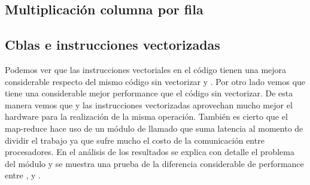 \subsection{Multiplicación columna por fila}

    \def\model{ColumnByRow}
    \def\analisisAmdahl{
    Se puede observar que el speed up teórico tiende al máximo speed-up,
    mientras que el real nos muestra que no usa toda la paralelizacion, ya que al
    pasar de 1 a 2 threads el tiempo no cae a la mitad, y al pasar de 1 a 4 threads
    no cae a la cuarta parte. Se puede ver que tiene un speed-up de casi 2 lo
    cual quiere decir que hace uso de la mitad de la paralelización.
    }
    \def\analisisGustafson{
    Se puede ver que estos resultados demuestran que la sección serie del
    problema se mantiene casi constante respecto de la sección paralela,
    que varía en forma ascendente con el tamaño de los datos de entrada.
    Pero además se puede observar que hay mucha ineficiencia respecto del uso de
    la paralelización, ya que al aumentar el trabajo en casi el doble y usar
    dos procesadores debería tardar aproximadamente lo mismo. Sin embargo, vemos
    que el tiempo paralelo se duplicó, lo cual muestra que hay un problema de
    comunicación al aumentar el paralelismo. Más adelante se explicará que el
    módulo Pool es ineficiente respecto del uso de recursos.
    }
    
    \newpage
    \clearpage

\subsection{Cblas e instrucciones vectorizadas}
    \def\text{Tiempo serie de multiplicación en segundos}
    \def\path{dgemm.png}
    \def\scale{.6}
    

    Podemos ver que las instrucciones vectoriales en el código
     tienen una mejora considerable respecto del mismo
    código sin vectorizar y . Por otro lado vemos que 
    tiene una considerable mejor performance que el código
     sin vectorizar.
    De esta manera vemos que  y las instrucciones vectorizadas
    aprovechan mucho mejor el hardware para la realización de la misma operación.
    También es cierto que el map-reduce hace uso de un módulo de 
    llamado  que suma latencia al momento de dividir el trabajo ya
    que sufre mucho el costo de la comunicación entre procesadores. En el análisis
    de los resultados se explica con detalle el problema del módulo 
    y se muestra una prueba de la diferencia considerable de performance entre
    ,  y .
